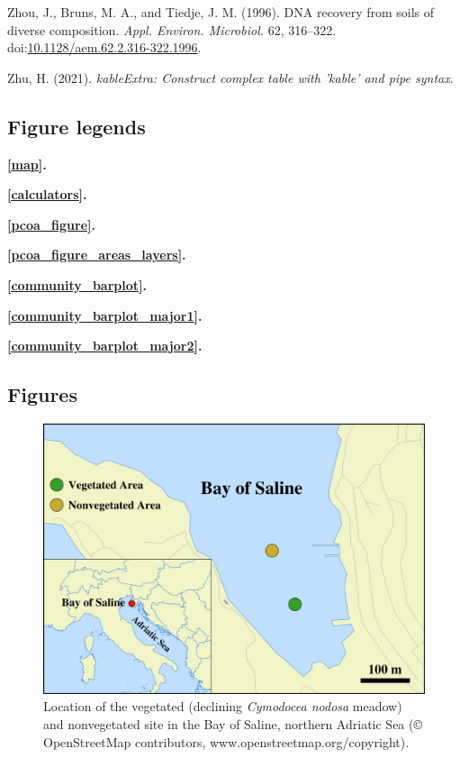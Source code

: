 \documentclass[12pt,]{article}
\begin{document}
\leavevmode\hypertarget{ref-Zhou1996b}{}%
Zhou, J., Bruns, M. A., and Tiedje, J. M. (1996). DNA recovery from
soils of diverse composition. \emph{Appl. Environ. Microbiol.} 62,
316--322.
doi:\href{https://doi.org/10.1128/aem.62.2.316-322.1996}{10.1128/aem.62.2.316-322.1996}.

\leavevmode\hypertarget{ref-Zhu2021}{}%
Zhu, H. (2021). \emph{kableExtra: Construct complex table with 'kable'
and pipe syntax}.

\newpage 
\setlength\parindent{0pt}

\hypertarget{figure-legends}{%
\subsection{Figure legends}\label{figure-legends}}

\textbf{\autoref{map}.} 

\textbf{\autoref{calculators}.} 

\textbf{\autoref{pcoa_figure}.} 

\textbf{\autoref{pcoa_figure_areas_layers}.}

\textbf{\autoref{community_barplot}.} 

\textbf{\autoref{community_barplot_major1}.}

\textbf{\autoref{community_barplot_major2}.}

\newpage

\hypertarget{figures}{%
\subsection{Figures}\label{figures}}

\begin{figure}[H]

{\centering \includegraphics[width=1\linewidth]{../results/figures/map} 

}

\caption{Location of the vegetated (declining \textit{Cymodocea nodosa} meadow) and nonvegetated site in the Bay of Saline, northern Adriatic Sea (© OpenStreetMap contributors, www.openstreetmap.org/copyright).\label{map}}\label{fig:unnamed-chunk-1}
\end{figure}
\end{document}
